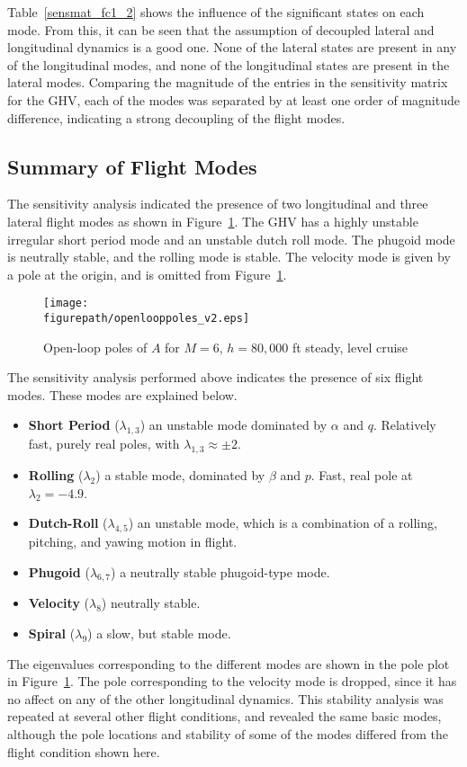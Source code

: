 Table~\ref{sensmat_fc1_2} shows the influence of the significant states on each mode.
From this, it can be seen that the assumption of decoupled lateral and longitudinal dynamics is a good one.
None of the lateral states are present in any of the longitudinal modes, and none of the longitudinal states are present in the lateral modes.
Comparing the magnitude of the entries in the sensitivity matrix for the GHV, each of the modes was separated by at least one order of magnitude difference, indicating a strong decoupling of the flight modes.

\subsection{Summary of Flight Modes}

The sensitivity analysis indicated the presence of two longitudinal and three lateral flight modes as shown in Figure~\ref{fig:poleplot}.
The GHV has a highly unstable irregular short period mode and an unstable dutch roll mode.
The phugoid mode is neutrally stable, and the rolling mode is stable.
The velocity mode is given by a pole at the origin, and is omitted from Figure~\ref{fig:poleplot}.

\begin{figure}[H]
  \centering
  \texttt{[image: \\figurepath/openlooppoles\_v2.eps]}
  \caption{Open-loop poles of $A$ for $M=6$, $h=80,000$ ft steady, level cruise\label{fig:poleplot}}
\end{figure}

The sensitivity analysis performed above indicates the presence of six flight modes.
These modes are explained below.
\begin{itemize}\itemsep2pt
  \item{\textbf{Short Period} ($\lambda_{1,3}$) \textemdash{} an unstable mode dominated by $\alpha$ and $q$. Relatively fast, purely real poles, with $\lambda_{1,3}\approx\pm2$.}
  \item{\textbf{Rolling} ($\lambda_{2}$) \textemdash{} a stable mode, dominated by $\beta$ and $p$. Fast, real pole at $\lambda_{2}=-4.9$.}
  \item{\textbf{Dutch-Roll} ($\lambda_{4,5}$) \textemdash{} an unstable mode, which is a combination of a rolling, pitching, and yawing motion in flight.}
  \item{\textbf{Phugoid} ($\lambda_{6,7}$) \textemdash{} a neutrally stable phugoid-type mode.}
  \item{\textbf{Velocity} ($\lambda_{8}$) \textemdash{} neutrally stable.}
  \item{\textbf{Spiral} ($\lambda_{9}$) \textemdash{} a slow, but stable mode.}
\end{itemize}
The eigenvalues corresponding to the different modes are shown in the pole plot in Figure~\ref{fig:poleplot}.
The pole corresponding to the velocity mode is dropped, since it has no affect on any of the other longitudinal dynamics.
This stability analysis was repeated at several other flight conditions, and revealed the same basic modes, although the pole locations and stability of some of the modes differed from the flight condition shown here.

